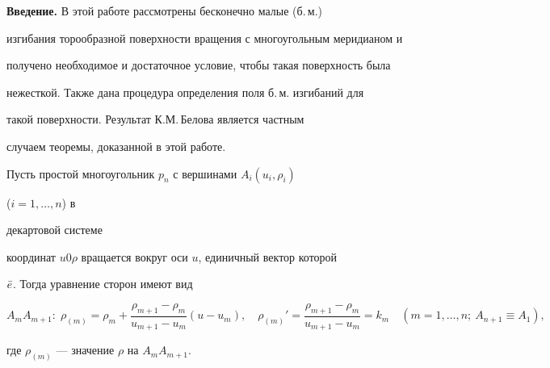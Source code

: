 \pagestyle{plain} %













\maketitle










{\bf Введение.} В этой работе рассмотрены бесконечно малые (б.\,м.)


изгибания торообразной поверхности вращения с многоугольным меридианом и


получено необходимое и достаточное условие, чтобы такая поверхность была


нежесткой. Также дана процедура определения поля б.\,м. изгибаний для


такой поверхности. Результат К.М.\,Белова \cite{Bel} является частным


случаем теоремы, доказанной в этой работе.





Пусть простой многоугольник $p_n$ с вершинами $A_i(u_i,\rho_i)$


($i=1,\dotsc,n$) в


декартовой системе


координат $u0\rho$ вращается вокруг оси $u$, единичный вектор которой


$\Bar e$. Тогда уравнение сторон имеют вид


\begin{equation}


A_mA_{m+1}:\;\rho_{(m)}=\rho_m+


\frac{\rho_{m+1}-\rho_m}{u_{m+1}-u_m}(u-u_m),\quad


\rho_{(m)}'=\frac{\rho_{m+1}-\rho_m}{u_{m+1}-u_m}=k_m \quad


(m=1,\dotsc,n; \ A_{n+1}\equiv A_1),


\end{equation}


где $\rho_{(m)}$ --- значение $\rho$ на $A_mA_{m+1}$.





